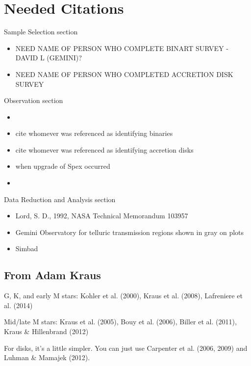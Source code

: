 \section{Needed Citations}

\begin{bf}Sample Selection section\end{bf}
	\begin{itemize}
		\item{} NEED NAME OF PERSON WHO COMPLETE BINART SURVEY - DAVID L (GEMINI)?
		\item{} NEED NAME OF PERSON WHO COMPLETED ACCRETION DISK SURVEY
\end{itemize}

\begin{bf}Observation section\end{bf}
	\begin{itemize}
		\item{} \cite{Rayner_2003}
		\item{} cite whomever was referenced as identifying binaries \cite{Adam_Krauss_or_other_paper}
		\item{} cite whomever was referenced as identifying accretion disks \cite{disk_guy}
		\item{} when upgrade of Spex occurred \cite{Spex}\\
		\item{} \cite{2mass_catalog_for_j_mags}
	\end{itemize} 


\begin{bf}Data Reduction and Analysis section\end{bf}
	\begin{itemize}
		\item{} Lord, S. D., 1992, NASA Technical Memorandum 103957
		\item{} Gemini Observatory for telluric transmission regions shown in gray on plots
  		\item{} Simbad
  
	\end{itemize}

\subsection{From Adam Kraus}
G, K, and early M stars: Kohler et al. (2000), Kraus et al. (2008), Lafreniere et al. (2014)

Mid/late M stars: Kraus et al. (2005), Bouy et al. (2006), Biller et al. (2011), Kraus & Hillenbrand (2012)

For disks, it's a little simpler. You can just use Carpenter et al. (2006, 2009) and Luhman & Mamajek (2012). 
